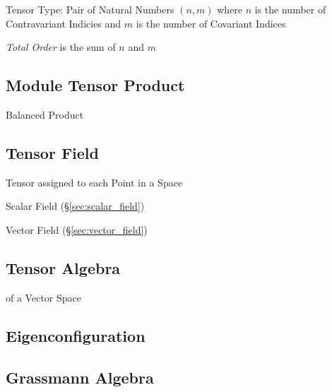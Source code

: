 Tensor Type: Pair of Natural Numbers $(n,m)$ where $n$ is the number
of Contravariant Indicies and $m$ is the number of Covariant Indices

\emph{Total Order} is the sum of $n$ and $m$



\subsection{Module Tensor Product}\label{sec:module_tensor}

Balanced Product



\subsection{Tensor Field}\label{sec:tensor_field}

Tensor assigned to each Point in a Space

Scalar Field (\S\ref{sec:scalar_field})

Vector Field (\S\ref{sec:vector_field})



\subsection{Tensor Algebra}\label{sec:tensor_algebra}

of a Vector Space



\subsection{Eigenconfiguration}\label{sec:eigenconfiguration}

\subsection{Grassmann Algebra}\label{sec:grassmann_algebra}

